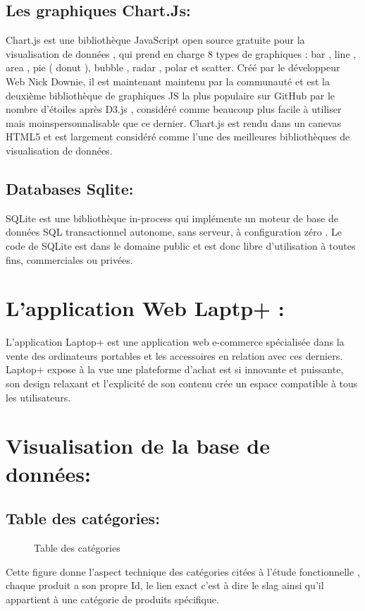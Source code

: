 \documentclass[a4paper]{report}
\begin{document}
\begin{doublespace}
	\subsection{ Les graphiques Chart.Js:}
	\begin{figure}[H]
		\raggedleft{
		}
	\end{figure}
	Chart.js est une bibliothèque JavaScript open source
	gratuite pour la visualisation de données , qui prend en charge 8 types de
	graphiques : bar , line , area , pie ( donut ), bubble , radar , polar et
	scatter. Créé par le développeur Web  Nick Downie, il est maintenant maintenu
	par la communauté et est la deuxième bibliothèque de graphiques JS la plus
	populaire sur GitHub par le nombre d'étoiles après D3.js , considéré comme
	beaucoup plus facile à utiliser mais moinspersonnalisable que ce dernier.
	Chart.js est rendu dans un canevas HTML5 et est largement considéré comme l'une
	des meilleures bibliothèques de visualisation de données.
	\subsection{Databases Sqlite:}
	\begin{figure}[H]
		\raggedleft{
		}
	\end{figure}
	SQLite est une bibliothèque in-process qui implémente
	un moteur de base de données SQL transactionnel autonome, sans serveur, à
	configuration zéro . Le code de SQLite est dans le domaine public et est donc
	libre d'utilisation à toutes fins, commerciales ou privées.
	\newpage
	\section{L'application Web Laptp+ :}
	L'application Laptop+ est une application web
	e-commerce spécialisée dans la vente des ordinateurs portables et les
	accessoires en relation avec ces derniers. \\Laptop+ expose à la vue une
	plateforme d'achat est si innovante et puissante, son design relaxant et
	l’explicité de son contenu crée un espace compatible à tous les utilisateurs.
	
	\section{ Visualisation de la base de données:}
	\subsection{ Table des catégories: }
	\begin{figure}[H]
		\caption{Table des catégories}
	\end{figure}
	Cette figure donne l'aspect technique des catégories
	citées à l'étude
	fonctionnelle , chaque produit a son propre Id, le lien
	exact c'est à dire le slag ainsi qu'il appartient à une catégorie de produits
	spécifique.

\end{doublespace}
\end{document}
